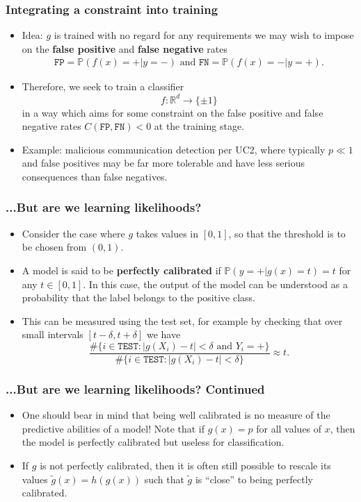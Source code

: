\documentclass{beamer}
\begin{document}
\begin{frame}
\frametitle{Integrating a constraint into training}
\begin{itemize}
\item
Idea: $g$ is trained with no regard for any requirements we may wish to impose on the \textbf{false positive} and \textbf{false negative} rates
\begin{align*}
\texttt{FP}=\mathbb P(f(x)=+|y=-)\text{ and }\texttt{FN}=\mathbb P(f(x)=-|y=+).
\end{align*}
\item
Therefore, we seek to train a classifier
$$
f:\mathbb R^d\rightarrow \{\pm 1\}
$$
in a way which aims for some constraint on the false positive and false negative rates $C(\texttt{FP},\texttt{FN})<0$ at the training stage.
\item
Example: malicious communication detection per UC2, where typically $p\ll 1$ and false positives may be far more tolerable and have less serious consequences than false negatives.
\end{itemize}
\end{frame}
\begin{frame}
\frametitle{...But are we learning likelihoods?}
\begin{itemize}
\item
Consider the case where $g$ takes values in $[0,1]$, so that the threshold is to be chosen from $(0,1)$.
\item
A model is said to be \textbf{perfectly calibrated} if $\mathbb P(y=+|g(x)=t)=t$ for any $t\in[0,1]$.
In this case, the output of the model can be understood as a probability that the label belongs to the positive class.
\item
This can be measured using the test set, for example by checking that over small intervals $[t-\delta,t+\delta]$ we have
$$
\frac{\#\{i\in\texttt{TEST}: |g(X_i)-t|<\delta\text{ and }Y_i=+\}}{\#\{i\in\texttt{TEST}: |g(X_i)-t|<\delta\}}\approx t.
$$
\end{itemize}
\end{frame}
\begin{frame}
\frametitle{...But are we learning likelihoods? Continued}
\begin{itemize}
\item
One should bear in mind that being well calibrated is no measure of the predictive abilities of a model!
Note that if $g(x)=p$ for all values of $x$, then the model is perfectly calibrated but useless for classification.
\item
If $g$ is not perfectly calibrated, then it is often still possible to rescale its values $\tilde g(x)=h(g(x))$ such that $\tilde g$ is ``close'' to being perfectly calibrated.
\end{itemize}
\end{frame}
\end{document}
